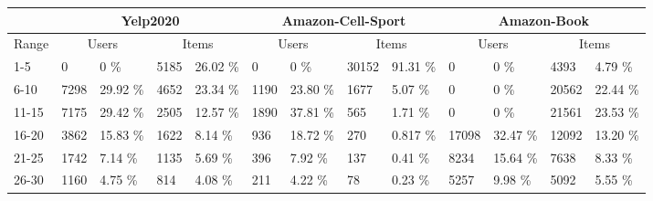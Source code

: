 \begin{table*}[]
    \begin{tabular}{|l|l|l|l|l|l|l|l|l|l|l|l|l|}
        \hline
                & \multicolumn{4}{c|}{Yelp2020} & \multicolumn{4}{c|}{Amazon-Cell-Sport} & \multicolumn{4}{c|}{Amazon-Book}                                                                                                                                                     \\ \hline
        Range   & \multicolumn{2}{c|}{Users}    & \multicolumn{2}{c|}{Items}             & \multicolumn{2}{c|}{Users}       & \multicolumn{2}{c|}{Items} & \multicolumn{2}{c|}{Users} & \multicolumn{2}{c|}{Items}                                                              \\ \hline
        1-5     & 0                             & 0 \%                                   & 5185                             & 26.02 \%                   & 0                          & 0 \%                       & 30152 & 91.31 \%     & 0     & 0 \%     & 4393  & 4.79  \% \\ \hline
        6-10    & 7298                          & 29.92 \%                               & 4652                             & 23.34 \%                   & 1190                       & 23.80 \%                   & 1677  & 5.07 \%      & 0     & 0 \%     & 20562 & 22.44 \% \\ \hline
        11-15   & 7175                          & 29.42 \%                               & 2505                             & 12.57 \%                   & 1890                       & 37.81 \%                   & 565   & 1.71 \%      & 0     & 0 \%     & 21561 & 23.53 \% \\ \hline
        16-20   & 3862                          & 15.83 \%                               & 1622                             & 8.14 \%                    & 936                        & 18.72 \%                   & 270   & 0.817 \%     & 17098 & 32.47 \% & 12092 & 13.20 \% \\ \hline
        21-25   & 1742                          & 7.14 \%                                & 1135                             & 5.69 \%                    & 396                        & 7.92 \%                    & 137   & 0.41 \%      & 8234  & 15.64 \% & 7638  & 8.33 \%  \\ \hline
        26-30   & 1160                          & 4.75 \%                                & 814                              & 4.08 \%                    & 211                        & 4.22 \%                    & 78    & 0.23 \%      & 5257  & 9.98 \%  & 5092  & 5.55 \%  \\ \hline

\end{tabular}
\end{table*}
